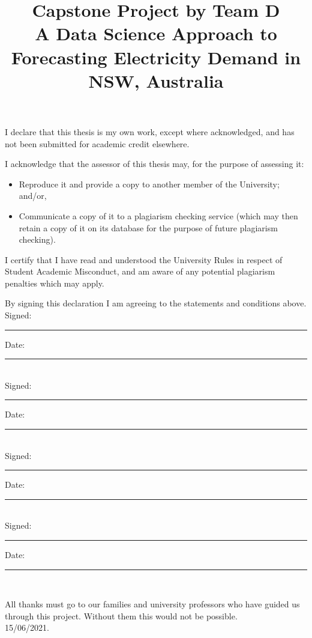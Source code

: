 \documentclass[mstat,12pt]{unswthesis}
\title{Capstone Project by Team D\\[0.5cm]A Data Science Approach to
Forecasting Electricity Demand in NSW, Australia}
\author{\Authornameonly}
\begin{document}
\beforepreface




\vskip 2pc \noindent I declare that this thesis is my
own work, except where acknowledged, and has not been submitted for
academic credit elsewhere. 

\vskip 2pc  \noindent I acknowledge that the assessor of this
thesis may, for the purpose of assessing it:
\begin{itemize}
\item Reproduce it and provide a copy to another member of the University; and/or,
\item Communicate a copy of it to a plagiarism checking service (which may then retain a copy of it on its database for the purpose of future plagiarism checking).
\end{itemize}

\vskip 2pc \noindent I certify that I have read and understood the University Rules in
respect of Student Academic Misconduct, and am aware of any potential plagiarism penalties which may 
apply.\vspace{24pt}

\vskip 2pc \noindent By signing 
this declaration I am
agreeing to the statements and conditions above.
\vskip 2pc \noindent
Signed: \rule{7cm}{0.25pt} \hfill Date: \rule{4cm}{0.25pt} \\[1cm]
Signed: \rule{7cm}{0.25pt} \hfill Date: \rule{4cm}{0.25pt} \\[1cm]
Signed: \rule{7cm}{0.25pt} \hfill Date: \rule{4cm}{0.25pt} \\[1cm]
Signed: \rule{7cm}{0.25pt} \hfill Date: \rule{4cm}{0.25pt} \\[1cm]
\vskip 1pc





{\bigskip}All thanks must go to our families and university professors
who have guided us through this project. Without them this would not be
possible.\\[1cm] 

{\bigskip\bigskip\bigskip\noindent} 15/06/2021.



\end{document}
